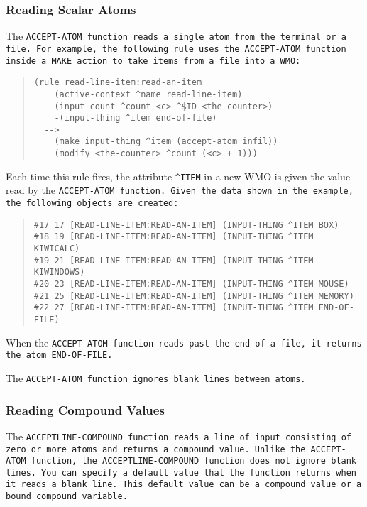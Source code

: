 \subsubsection{Reading Scalar Atoms}

The \tt{ACCEPT-ATOM} function reads a single atom from the terminal or
a file. For example, the following rule uses the \tt{ACCEPT-ATOM}
function inside a \tt{MAKE} action to take items from a file into a
WMO:

\begin{quote}
\begin{verbatim}
(rule read-line-item:read-an-item
    (active-context ^name read-line-item)
    (input-count ^count <c> ^$ID <the-counter>)
    -(input-thing ^item end-of-file)
  -->
    (make input-thing ^item (accept-atom infil))
    (modify <the-counter> ^count (<c> + 1)))
\end{verbatim}
\end{quote}

Each time this rule fires, the attribute \verb|^ITEM| in a new WMO is
given the value read by the \tt{ACCEPT-ATOM} function. Given the data
shown in the example, the following objects are created:

\begin{quote}
\begin{verbatim}
#17 17 [READ-LINE-ITEM:READ-AN-ITEM] (INPUT-THING ^ITEM BOX)
#18 19 [READ-LINE-ITEM:READ-AN-ITEM] (INPUT-THING ^ITEM KIWICALC)
#19 21 [READ-LINE-ITEM:READ-AN-ITEM] (INPUT-THING ^ITEM KIWINDOWS)
#20 23 [READ-LINE-ITEM:READ-AN-ITEM] (INPUT-THING ^ITEM MOUSE)
#21 25 [READ-LINE-ITEM:READ-AN-ITEM] (INPUT-THING ^ITEM MEMORY)
#22 27 [READ-LINE-ITEM:READ-AN-ITEM] (INPUT-THING ^ITEM END-OF-FILE)
\end{verbatim}
\end{quote}

When the \tt{ACCEPT-ATOM} function reads past the end of a file, it
returns the atom \tt{END-OF-FILE}.

The \tt{ACCEPT-ATOM} function ignores blank lines between atoms.

\subsubsection{Reading Compound Values}

The \tt{ACCEPTLINE-COMPOUND} function reads a line of input consisting
of zero or more atoms and returns a compound value. Unlike the
\tt{ACCEPT-ATOM} function, the \tt{ACCEPTLINE-COMPOUND} function does
not ignore blank lines. You can specify a default value that the
function returns when it reads a blank line. This default value can be
a compound value or a bound compound variable.

